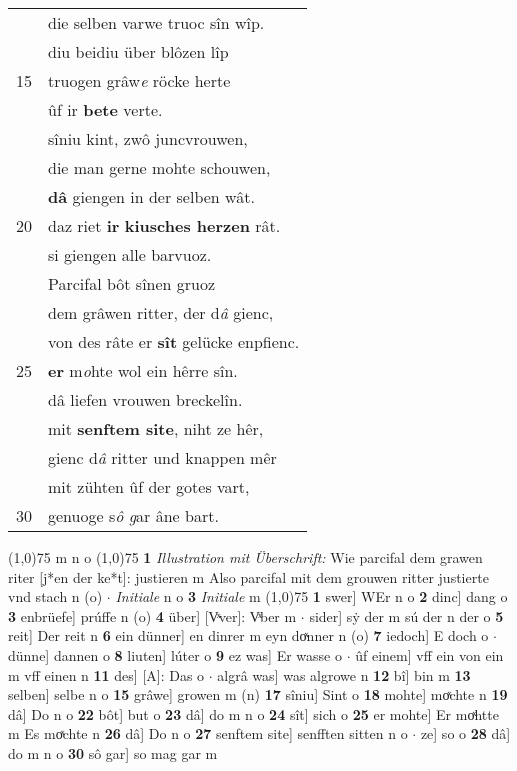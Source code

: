 \documentclass[8pt,a4paper,notitlepage]{article}
\begin{document}
\begin{table}[ht]
\begin{minipage}[t]{0.5\linewidth}
\begin{tabular}{rl}
 & die selben varwe truoc sîn wîp.\\ 
 & diu beidiu über blôzen lîp\\ 
15 & truogen grâw\textit{e} röcke herte\\ 
 & ûf ir \textbf{bete} verte.\\ 
 & sîniu kint, zwô juncvrouwen,\\ 
 & die man gerne mohte schouwen,\\ 
 & \textbf{dâ} giengen in der selben wât.\\ 
20 & daz riet \textbf{ir} \textbf{kiusches herzen} rât.\\ 
 & si giengen alle barvuoz.\\ 
 & Parcifal bôt sînen gruoz\\ 
 & dem grâwen ritter, der d\textit{â} gienc,\\ 
 & von des râte er \textbf{sît} gelücke enpfienc.\\ 
25 & \textbf{er} m\textit{o}hte wol ein hêrre sîn.\\ 
 & dâ liefen vrouwen breckelîn.\\ 
 & mit \textbf{senftem site}, niht ze hêr,\\ 
 & gienc d\textit{â} ritter und knappen mêr\\ 
 & mit zühten ûf der gotes vart,\\ 
30 & genuoge s\textit{ô} \textit{g}ar âne bart.\\ 
\end{tabular}
\scriptsize
\line(1,0){75} \newline
m n o \newline
\line(1,0){75} \newline
\textbf{1} \textit{Illustration mit Überschrift:} Wie parcifal dem grawen riter [j*en der ke*t]: justieren m  Also parcifal mit dem grouwen ritter justierte vnd stach n (o)   $\cdot$ \textit{Initiale} n o  \textbf{3} \textit{Initiale} m  \newline
\line(1,0){75} \newline
\textbf{1} swer] WEr n o \textbf{2} dinc] dang o \textbf{3} enbrüefe] prúffe n (o) \textbf{4} über] [Vͯver]: Vͯber m  $\cdot$ sider] sẏ der m sú der n der o \textbf{5} reit] Der reit n \textbf{6} ein dünner] en dinrer m eyn doͯnner n (o) \textbf{7} iedoch] E doch o  $\cdot$ dünne] dannen o \textbf{8} liuten] lúter o \textbf{9} ez was] Er wasse o  $\cdot$ ûf einem] vff ein von ein m vff einen n \textbf{11} des] [A]: Das o  $\cdot$ algrâ was] was algrowe n \textbf{12} bî] bin m \textbf{13} selben] selbe n o \textbf{15} grâwe] growen m (n) \textbf{17} sîniu] Sint o \textbf{18} mohte] moͯchte n \textbf{19} dâ] Do n o \textbf{22} bôt] but o \textbf{23} dâ] do m n o \textbf{24} sît] sich o \textbf{25} er mohte] Er moͯhtte m Es moͯchte n \textbf{26} dâ] Do n o \textbf{27} senftem site] senfften sitten n o  $\cdot$ ze] so o \textbf{28} dâ] do m n o \textbf{30} sô gar] so mag gar m \newline
\end{minipage}
\end{table}
\end{document}
